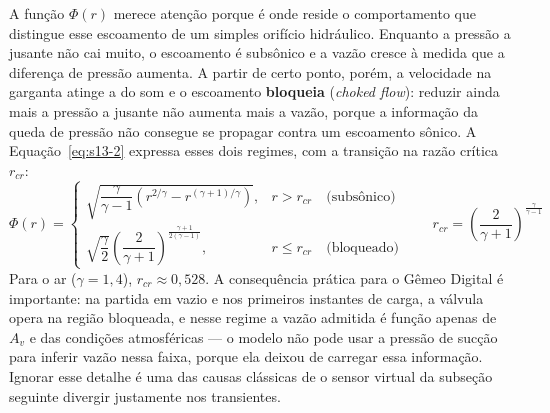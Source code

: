 \documentclass[12pt,a4paper]{article}
\numberwithin{equation}{section}
\numberwithin{table}{section}
\numberwithin{figure}{section}
\begin{document}
	A função $\Phi(r)$ merece atenção porque é onde reside o comportamento que distingue esse escoamento de um simples orifício hidráulico. Enquanto a pressão a jusante não cai muito, o escoamento é subsônico e a vazão cresce à medida que a diferença de pressão aumenta. A partir de certo ponto, porém, a velocidade na garganta atinge a do som e o escoamento \textbf{bloqueia} (\textit{choked flow}): reduzir ainda mais a pressão a jusante não aumenta mais a vazão, porque a informação da queda de pressão não consegue se propagar contra um escoamento sônico. A Equação~\eqref{eq:s13-2} expressa esses dois regimes, com a transição na razão crítica $r_{cr}$:
	\begin{equation}\label{eq:s13-2}
	\Phi(r) = \begin{cases}
	\sqrt{\dfrac{\gamma}{\gamma - 1}\left(r^{2/\gamma} - r^{(\gamma+1)/\gamma}\right)}, & r > r_{cr} \quad \text{(subsônico)} \\[1.4em]
	\sqrt{\dfrac{\gamma}{2}}\left(\dfrac{2}{\gamma+1}\right)^{\frac{\gamma+1}{2(\gamma-1)}}, & r \leq r_{cr} \quad \text{(bloqueado)}
	\end{cases}
	\qquad r_{cr} = \left(\frac{2}{\gamma+1}\right)^{\frac{\gamma}{\gamma-1}}
	\end{equation}
	Para o ar ($\gamma = 1{,}4$), $r_{cr} \approx 0{,}528$. A consequência prática para o Gêmeo Digital é importante: na partida em vazio e nos primeiros instantes de carga, a válvula opera na região bloqueada, e nesse regime a vazão admitida é função apenas de $A_v$ e das condições atmosféricas — o modelo não pode usar a pressão de sucção para inferir vazão nessa faixa, porque ela deixou de carregar essa informação. Ignorar esse detalhe é uma das causas clássicas de o sensor virtual da subseção seguinte divergir justamente nos transientes.
\end{document}
